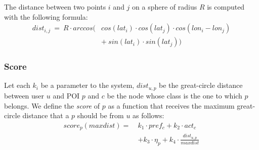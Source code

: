 The distance between two points $i$ and $j$ on a sphere of radius $R$ is computed with the following formula:
\begin{equation} \label{eq:gc-dist}
    \begin{split}
        \scriptstyle{dist_{i,j} \ = \ R \cdot arccos (} & \scriptstyle{cos(lat_i) \cdot cos(lat_j) \cdot cos(lon_i - lon_j)} \\
                                        & \scriptstyle{+ \ sin(lat_i) \cdot sin(lat_j) )}
    \end{split}
\end{equation}

\subsubsection{Score}
Let each $k_i$ be a parameter to the system, $dist_{u,p}$ be the great-circle distance between user $u$ and POI $p$ and $c$ be the node whose class is the one to which $p$ belongs. We define the \textit{score} of $p$ as a function that receives the maximum great-circle distance that a $p$ should be from $u$ as follows:
\begin{equation} \label{eq:score}
    \begin{split}
        score_p(maxdist) = \ &k_1 \cdot pref_c + k_2 \cdot act_c \\
                                        &+ k_3 \cdot \eta_p + k_4 \cdot \frac{dist_{u,p}}{maxdist}
    \end{split}
\end{equation}
